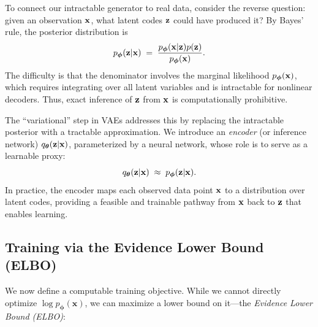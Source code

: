 To connect our intractable generator to real data, consider the reverse question:  
given an observation ${\mathbf{x}}$, what latent codes ${\mathbf{z}}$ could have produced it?  
By Bayes’ rule, the posterior distribution is
\[
p_{\bm{\phi}}({\mathbf{z}}|{\mathbf{x}}) \;=\; \frac{p_{\bm{\phi}}({\mathbf{x}}|{\mathbf{z}}) p({\mathbf{z}})}{p_{\bm{\phi}}({\mathbf{x}})}.
\]
The difficulty is that the denominator involves the marginal likelihood $p_{\bm{\phi}}({\mathbf{x}})$,  
which requires integrating over all latent variables and is intractable for nonlinear decoders.  
Thus, exact inference of ${\mathbf{z}}$ from ${\mathbf{x}}$ is computationally prohibitive.

The ``variational'' step in VAEs addresses this by replacing the intractable posterior with a tractable approximation.  
We introduce an \emph{encoder} (or inference network) $q_{\bm{\theta}}({\mathbf{z}}|{\mathbf{x}})$, parameterized by a neural network,  
whose role is to serve as a learnable proxy:
\[
q_{\bm{\theta}}({\mathbf{z}}|{\mathbf{x}}) \;\approx\; p_{\bm{\phi}}({\mathbf{z}}|{\mathbf{x}}).
\]
In practice, the encoder maps each observed data point ${\mathbf{x}}$ to a distribution over latent codes,  
providing a feasible and trainable pathway from ${\mathbf{x}}$ back to ${\mathbf{z}}$ that enables learning.




\subsection{Training via the Evidence Lower Bound (ELBO)}

We now define a computable training objective. While we cannot directly optimize $\log p_{\bm{\phi}}(\mathbf{x})$, we can maximize a lower bound on it—the \emph{Evidence Lower Bound (ELBO)}:

